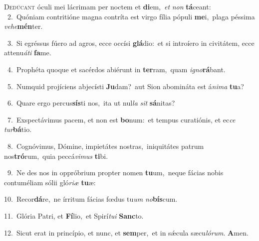 \lettrine{\initial\textcolor{\initialcolor}{D}}{edúcant} óculi mei lácrimam per noctem et \textbf{di}\-em,~\star \textit{et} \textit{non} \textbf{tá}\-ceant:\\
{\numbfont\textcolor{\numbcolor}{~2.}}~Quóniam contritióne magna contríta est virgo fília pópuli \textbf{me}\-i,~\star plaga péssima \textit{ve}\-\textit{he}\textbf{mén}ter.\par
{\numbfont\textcolor{\numbcolor}{~3.}}~Si egréssus fúero ad agros, ecce occísi \textbf{glá}\-dio:~\star et si introíero in civitátem, ecce attenu\-\textit{á}\-\textit{ti} \textbf{fa}\-me.\par
{\numbfont\textcolor{\numbcolor}{~4.}}~Prophéta quoque et sacérdos abiérunt in \textbf{ter}\-ram,~\star quam \textit{i}\-\textit{gno}\textbf{rá}bant.\par
{\numbfont\textcolor{\numbcolor}{~5.}}~Numquid projíciens abjecísti \textbf{Ju}\-dam?~\star aut Sion abomináta est á\-\textit{ni}\-\textit{ma} \textbf{tu}\-a?\par
{\numbfont\textcolor{\numbcolor}{~6.}}~Quare ergo percus\-\textbf{sís}\-ti nos,~\star ita ut nul\textit{la} \textit{sit} \textbf{sá}\-nitas?\par
{\numbfont\textcolor{\numbcolor}{~7.}}~Exspectávimus pacem, et non est \textbf{bo}\-num:~\star et tempus curatiónis, et ec\textit{ce} \textit{tur}\-\textbf{bá}tio.\par
{\numbfont\textcolor{\numbcolor}{~8.}}~Cognóvimus, Dómine, impietátes nostras,~\dagger iniquitátes patrum nos\-\textbf{tró}\-rum,~\star quia peccá\-\textit{vi}\-\textit{mus} \textbf{ti}\-bi.\par
{\numbfont\textcolor{\numbcolor}{~9.}}~Ne des nos in oppróbrium propter nomen \textbf{tu}\-um,~\star neque fácias nobis contuméliam sólii gló\-\textit{ri}\-\textit{æ} \textbf{tu}\-æ:\par
{\numbfont\textcolor{\numbcolor}{10.}}~Recor\-\textbf{dá}\-re,~\star ne írritum fácias fœdus tu\textit{um} \textit{no}\-\textbf{bís}cum.\par
{\numbfont\textcolor{\numbcolor}{11.}}~Glória Patri, et \textbf{Fí}\-lio,~\star et Spirí\-\textit{tu}\-\textit{i} \textbf{Sanc}\-to.\par
{\numbfont\textcolor{\numbcolor}{12.}}~Sicut erat in princípio, et nunc, et \textbf{sem}\-per,~\star et in sǽcula sæcu\-\textit{ló}\-\textit{rum}. \textbf{A}\-men.\par
